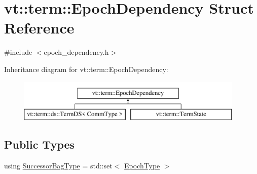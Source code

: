 \hypertarget{structvt_1_1term_1_1_epoch_dependency}{}\section{vt\+:\+:term\+:\+:Epoch\+Dependency Struct Reference}
\label{structvt_1_1term_1_1_epoch_dependency}


{\ttfamily \#include $<$epoch\+\_\+dependency.\+h$>$}

Inheritance diagram for vt\+:\+:term\+:\+:Epoch\+Dependency\+:\begin{figure}[H]
\begin{center}
\leavevmode
\includegraphics[height=2.000000cm]{structvt_1_1term_1_1_epoch_dependency}
\end{center}
\end{figure}
\subsection*{Public Types}
\begin{DoxyCompactItemize}
\item 
using \hyperlink{structvt_1_1term_1_1_epoch_dependency_a3f00b47c33158f3241ebbeb0a0cb7b1d}{Successor\+Bag\+Type} = std\+::set$<$ \hyperlink{namespacevt_a81d11b28122d43bf9834577e4a06440f}{Epoch\+Type} $>$
\end{DoxyCompactItemize}
